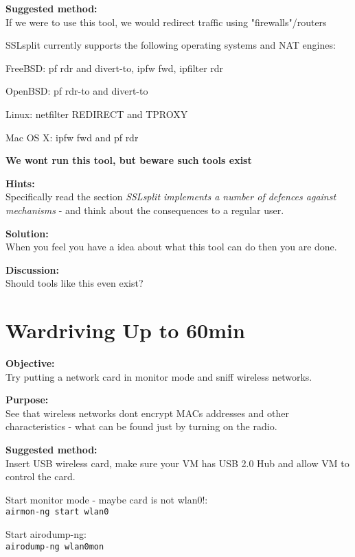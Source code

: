 \documentclass[a4paper,11pt,notitlepage]{report}
\begin{document}
{\bf Suggested method:}\\
If we were to use this tool, we would redirect traffic using "firewalls"/routers

\begin{list2}
\item SSLsplit currently supports the following operating systems and NAT engines:
\item FreeBSD: pf rdr and divert-to, ipfw fwd, ipfilter rdr
\item OpenBSD: pf rdr-to and divert-to
\item Linux: netfilter REDIRECT and TPROXY
\item Mac OS X: ipfw fwd and pf rdr
\end{list2}

{\bf We wont run this tool, but beware such tools exist}

{\bf Hints:}\\
Specifically read the section \emph{SSLsplit implements a number of defences against mechanisms} - and think about the consequences to a regular user.

{\bf Solution:}\\
When you feel you have a idea about what this tool can do then you are done.

{\bf Discussion:}\\
Should tools like this even exist?



\chapter{Wardriving Up to 60min}
\label{ex:wardriving}

{\bf Objective:}\\
Try putting a network card in monitor mode and sniff wireless networks.

{\bf Purpose:}\\
See that wireless networks dont encrypt MACs addresses and other characteristics - what can be found just by turning on the radio.

{\bf Suggested method:}\\
Insert USB wireless card, make sure your VM has USB 2.0 Hub and allow VM to control the card.

Start monitor mode - maybe card is not wlan0!:\\
\verb+airmon-ng start wlan0+

Start airodump-ng:\\
\verb+airodump-ng wlan0mon+
\end{document}
